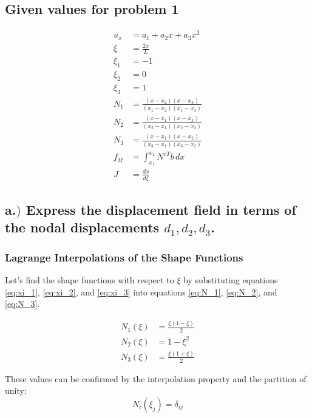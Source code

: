 \subsection*{Given values for problem 1}

\begin{align}
    u_{x} &= a_{1} + a_{2}x + a_{3}x^{2} \label{eq:u_x} \\
    \xi &= \frac{2x}{L} \label{eq:xi} \\
    \xi_{1} &= -1 \label{eq:xi_1} \\
    \xi_{2} &= 0 \label{eq:xi_2} \\
    \xi_{3} &= 1 \label{eq:xi_3} \\
    N_1 &= \frac{(x - x_2)(x - x_3)}{(x_1 - x_2)(x_1 - x_3)} \label{eq:N_1} \\
    N_2 &= \frac{(x - x_1)(x - x_3)}{(x_2 - x_1)(x_2 - x_3)} \label{eq:N_2} \\
    N_3 &= \frac{(x - x_1)(x - x_2)}{(x_3 - x_1)(x_3 - x_2)} \label{eq:N_3} \\
    f_{\Omega} &= \int_{x_1}^{x_2} N^{eT} b \, dx \label{eq:f_Omega} \\
    J &= \frac{dx}{d\xi} \label{eq:jacobian}
\end{align}

\subsection*{a.$)$ Express the displacement field in terms of the nodal displacements \( d_1, d_2, d_3 \).}

\subsubsection*{Lagrange Interpolations of the Shape Functions}

Let's find the shape functions with respect to \( \xi \) by substituting equations \eqref{eq:xi_1}, \eqref{eq:xi_2}, and \eqref{eq:xi_3} into equations \eqref{eq:N_1}, \eqref{eq:N_2}, and \eqref{eq:N_3}.

\begin{align}
    N_1(\xi) &= \frac{\xi (1 - \xi)}{2} \\
    N_2(\xi) &= 1 - \xi^2 \\
    N_3(\xi) &= \frac{\xi (1 + \xi)}{2}
\end{align}

These values can be confirmed by the interpolation property and the partition of unity:
\begin{equation*}
    N_i(\xi_j) = \delta_{ij}
\end{equation*}

